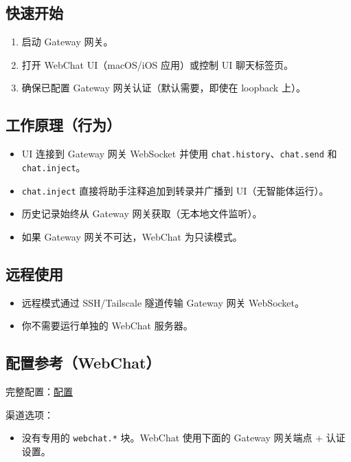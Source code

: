 \subsection{快速开始}


\begin{enumerate}
  \item 启动 Gateway 网关。
  \item 打开 WebChat UI（macOS/iOS 应用）或控制 UI 聊天标签页。
  \item 确保已配置 Gateway 网关认证（默认需要，即使在 loopback 上）。
\end{enumerate}


\subsection{工作原理（行为）}


\begin{itemize}
  \item UI 连接到 Gateway 网关 WebSocket 并使用 \texttt{chat.history}、\texttt{chat.send} 和 \texttt{chat.inject}。
  \item \texttt{chat.inject} 直接将助手注释追加到转录并广播到 UI（无智能体运行）。
  \item 历史记录始终从 Gateway 网关获取（无本地文件监听）。
  \item 如果 Gateway 网关不可达，WebChat 为只读模式。
\end{itemize}


\subsection{远程使用}


\begin{itemize}
  \item 远程模式通过 SSH/Tailscale 隧道传输 Gateway 网关 WebSocket。
  \item 你不需要运行单独的 WebChat 服务器。
\end{itemize}


\subsection{配置参考（WebChat）}


完整配置：\href{/gateway/configuration}{配置}

渠道选项：

\begin{itemize}
  \item 没有专用的 \texttt{webchat.*} 块。WebChat 使用下面的 Gateway 网关端点 + 认证设置。
\end{itemize}


